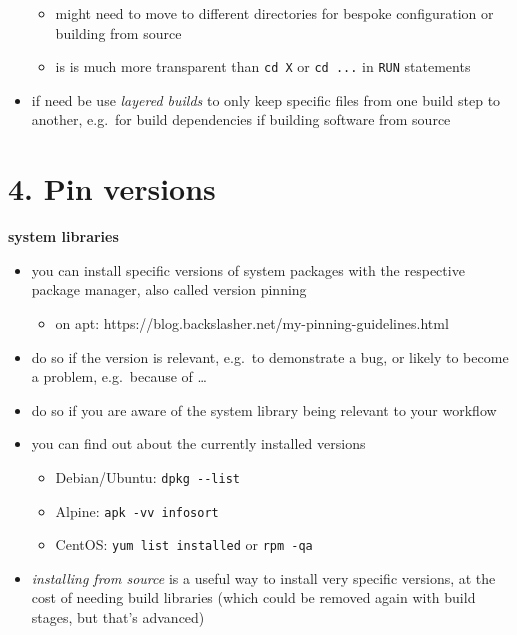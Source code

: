 \documentclass[10pt,letterpaper]{article}
\providecommand{\tightlist}{%
  \setlength{\itemsep}{0pt}\setlength{\parskip}{0pt}}
\begin{document}
\begin{itemize}
  \begin{itemize}
  \tightlist
  \item
    might need to move to different directories for bespoke
    configuration or building from source
  \item
    is is much more transparent than \texttt{cd\ X} or \texttt{cd\ ...}
    in \texttt{RUN} statements
  \end{itemize}
\item
  if need be use \emph{layered builds} to only keep specific files from
  one build step to another, e.g.~for build dependencies if building
  software from source
\end{itemize}

\hypertarget{pin-versions}{%
\section*{4. Pin versions}\label{pin-versions}}

\textbf{system libraries}

\begin{itemize}
\tightlist
\item
  you can install specific versions of system packages with the
  respective package manager, also called version pinning

  \begin{itemize}
  \tightlist
  \item
    on apt: https://blog.backslasher.net/my-pinning-guidelines.html
  \end{itemize}
\item
  do so if the version is relevant, e.g.~to demonstrate a bug, or likely
  to become a problem, e.g.~because of \ldots{}
\item
  do so if you are aware of the system library being relevant to your
  workflow
\item
  you can find out about the currently installed versions

  \begin{itemize}
  \tightlist
  \item
    Debian/Ubuntu: \texttt{dpkg\ -\/-list}
  \item
    Alpine: \texttt{apk\ -vv\ info\textbar{}sort}
  \item
    CentOS: \texttt{yum\ list\ installed} or \texttt{rpm\ -qa}
  \end{itemize}
\item
  \emph{installing from source} is a useful way to install very specific
  versions, at the cost of needing build libraries (which could be
  removed again with build stages, but that's advanced)
\end{itemize}
\end{document}

